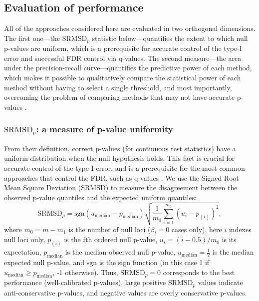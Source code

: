 \documentclass[11pt]{article}
\newcommand{\rmsd}{\text{SRMSD}_p}
\begin{document}
\subsection{Evaluation of performance}

All of the approaches considered here are evaluated in two orthogonal dimensions.
The first one---the $\rmsd$ statistic below---quantifies the extent to which null p-values are uniform, which is a prerequisite for accurate control of the type-I error and successful FDR control via q-values.
The second measure---the area under the precision-recall curve---quantifies the predictive power of each method, which makes it possible to qualitatively compare the statistical power of each method without having to select a single threshold, and most importantly, overcoming the problem of comparing methods that may not have accurate p-values \citep{bouaziz_accounting_2011}.

\subsubsection{$\rmsd$: a measure of p-value uniformity}

From their definition, correct p-values (for continuous test statistics) have a uniform distribution when the null hypothesis holds.
This fact is crucial for accurate control of the type-I error, and is a prerequisite for the most common approaches that control the FDR, such as q-values \citep{storey_positive_2003, storey_statistical_2003}.
We use the Signed Root Mean Square Deviation (SRMSD) to measure the disagreement between the observed p-value quantiles and the expected uniform quantiles:
$$
\rmsd
=
\text{sgn}(u_\text{median} - p_\text{median} ) \sqrt{ \frac{1}{m_0} \sum_{i = 1}^{m_0} \left( u_i - p_{(i)} \right)^2 },
$$
where
$m_0 = m - m_1$ is the number of null loci ($\beta_i = 0$ cases only),
here $i$ indexes null loci only,
$p_{(i)}$ is the $i$th ordered null p-value,
$u_i = ( i - 0.5 ) / m_0$ is its expectation,
$p_\text{median}$ is the median observed null p-value,
$u_\text{median} = \frac{1}{2}$ is the median expected null p-value,
and $\text{sgn}$ is the sign function (in this case 1 if $u_\text{median} \ge p_\text{median}$, -1 otherwise).
Thus, $\rmsd = 0$ corresponds to the best performance (well-calibrated p-values), large positive $\rmsd$ values indicate anti-conservative p-values, and negative values are overly conservative p-values.
\end{document}
